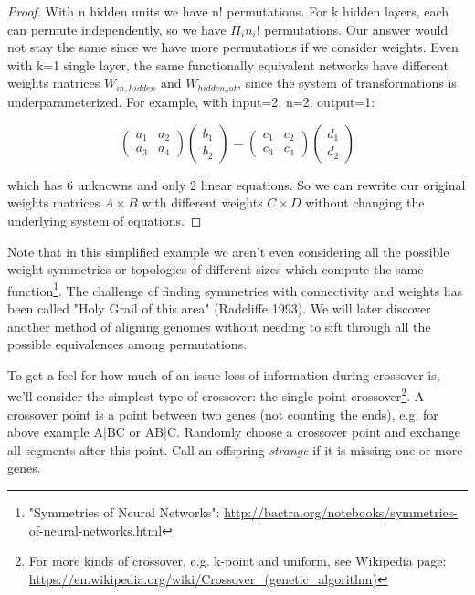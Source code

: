 \documentclass[12pt]{article}
\begin{document}
\begin{proof} 
With n hidden units we have n! permutations. For k hidden layers, each can permute independently, so we have $\Pi_i n_i!$ permutations. Our answer would not stay the same since we have more permutations if we consider weights. Even with k=1 single layer, the same functionally equivalent networks have different weights matrices $W_{in,hidden}$ and $W_{hidden_out}$, since the system of transformations is underparameterized. For example, with input=2, n=2, output=1:

\[
\begin{pmatrix}
a_1 & a_2 \\
a_3 & a_4
\end{pmatrix}
\begin{pmatrix}
b_1 \\
b_2
\end{pmatrix}
=
\begin{pmatrix}
c_1 & c_2 \\
c_3 & c_4
\end{pmatrix}
\begin{pmatrix}
d_1 \\
d_2
\end{pmatrix}
\]

which has 6 unknowns and only 2 linear equations. So we can rewrite our original weights matrices $A\times B$ with different weights $C\times D$ without changing the underlying system of equations.

\end{proof}

Note that in this simplified example we aren't even considering all the possible weight symmetries or topologies of different sizes which compute the same function\footnote{"Symmetries of Neural Networks": \url{http://bactra.org/notebooks/symmetries-of-neural-networks.html}}. The challenge of finding symmetries with connectivity and weights has been called "Holy Grail of this area" (Radcliffe 1993). We will later discover another method of aligning genomes without needing to sift through all the possible equivalences among permutations.

To get a feel for how much of an issue loss of information during crossover is, we'll consider the simplest type of crossover: the single-point crossover\footnote{For more kinds of crossover, e.g. k-point and uniform, see Wikipedia page: 
\url{https://en.wikipedia.org/wiki/Crossover_(genetic_algorithm)}}. A crossover point is a point between two genes (not counting the ends), e.g. for above example A|BC or AB|C. Randomly choose a crossover point and exchange all segments after this point. Call an offspring \textit{strange} if it is missing one or more genes.
\end{document}
